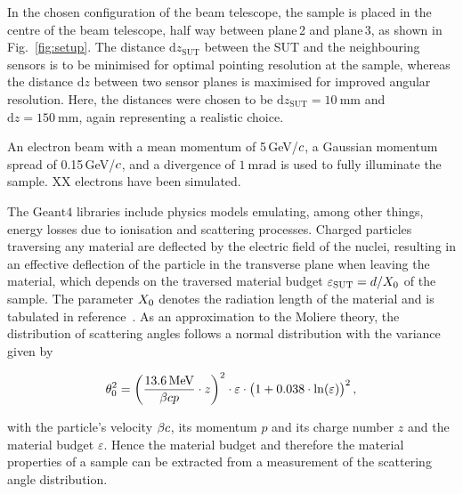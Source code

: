 \documentclass{PoS}
\newcommand{\eV}{\ensuremath{\textrm{eV}}}
\newcommand{\cspeed}{\ensuremath{\mathnormal{c}}}
\newcommand{\dz}{\ensuremath{\textrm{d}z}}
\newcommand{\dzsut}{\ensuremath{\textrm{d}z_{\textrm{SUT}}}}
\newcommand{\xzero}{\ensuremath{\mathnormal{X}_0}}
\newcommand{\Geant}{\ensuremath{\textrm{Geant4}}}
\begin{document}
In the chosen configuration of the beam telescope,
 the sample is placed in the centre of the beam telescope, half way between plane\,2 and plane\,3, as shown in Fig.~\ref{fig:setup}. %
The distance $\dzsut$ between the SUT and the neighbouring sensors is to be minimised for optimal pointing resolution at the sample,
 whereas the distance $\dz$ between two sensor planes is maximised for improved angular resolution.
Here, the distances were chosen to be $\dzsut =\SI{10}{\mm}$ and $\dz=\SI{150}{\mm}$, again representing a realistic choice. 

An electron beam with a mean momentum of 5\,GeV/$\cspeed$, a Gaussian momentum spread of 0.15\,GeV/$\cspeed$, and a divergence of $\SI{1}{\milli\radian}$ is used to fully illuminate the sample. 
XX electrons have been simulated. %

The $\Geant$ libraries include physics models emulating, among other things, energy losses due to ionisation and scattering processes.
Charged particles traversing any material are deflected by the electric field of the nuclei, resulting in an effective deflection of the particle in the transverse plane when leaving the material,
 which depends on the traversed material budget $\varepsilon_{\textrm{SUT}} = d / \xzero$ of the sample. 
The parameter $\xzero$ denotes the radiation length of the material and is tabulated in reference~\cite{ref:pdg2016}. 
As an approximation to the Moliere theory, the distribution of scattering angles follows a normal distribution with the variance given by~\cite{ref:scatteringhighland, ref:pdg2016} 

\begin{equation}
 \theta_0^2 = \left( \frac{\SI{13.6}{\mega\eV}}{\beta \cspeed p}\cdot z \right)^2 \cdot \varepsilon \cdot \big( 1+0.038\cdot\ln(\varepsilon) \big)^2\,,
 \label{eq:highland}
\end{equation}

\noindent
with the particle's velocity $\beta \cspeed$, its momentum $p$ and its charge number $z$ and the material budget $\varepsilon$. 
Hence the material budget and therefore the material properties of a sample can be extracted from a measurement of the scattering angle distribution.

\end{document}
